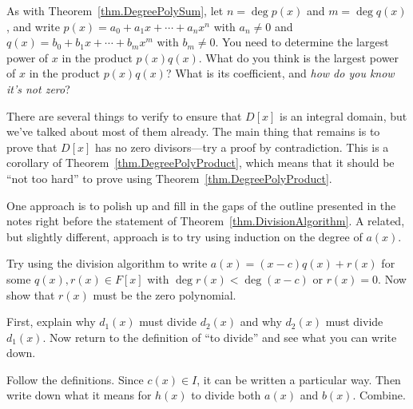\begin{hint*}
As with   Theorem~\ref{thm.DegreePolySum}, let $n = \deg p(x)$ and $m = \deg q(x)$, and  write $p(x) = a_0 + a_1x + \cdots + a_nx^n$ with $a_n\neq 0$ and $q(x) = b_0 + b_1x + \cdots + b_mx^m$ with $b_m\neq 0$. You need to determine the largest power of $x$ in the product $p(x)q(x)$. What do you think is the largest power of $x$ in the product $p(x)q(x)$? What is its coefficient, and \emph{how do you know it's not zero}?
\end{hint*}

\begin{hint*}
There are several things to verify to ensure that $D[x]$ is an integral domain, but we've talked about most of them already. The main thing that remains is to prove that $D[x]$ has no zero divisors---try a proof by contradiction. This is a corollary of Theorem~\ref{thm.DegreePolyProduct}, which means that it should be ``not too hard'' to prove using Theorem~\ref{thm.DegreePolyProduct}. 
\end{hint*}

\begin{hint*}
One approach is to polish up and fill in the gaps of the outline presented in the notes right before the statement of Theorem~\ref{thm.DivisionAlgorithm}. A related, but slightly different, approach is to try using induction on the degree of $a(x)$.
\end{hint*}

\begin{hint*}
Try  using the division algorithm to write $a(x) = (x-c)q(x) + r(x)$ for some $q(x),r(x)\in F[x]$ with $\deg r(x) < \deg (x-c)$ or $r(x) = 0$. Now show that $r(x)$ must be the zero polynomial.
\end{hint*}

\begin{hint*}
First, explain why $d_1(x)$ must divide $d_2(x)$ and why $d_2(x)$ must divide $d_1(x)$. Now return to the definition of ``to divide'' and see what you can write down.
\end{hint*}

\begin{hint*}
Follow the definitions. Since $c(x)\in I$, it can be written a particular way. Then write down what it means for $h(x)$ to divide both $a(x)$ and $b(x)$. Combine.
\end{hint*}

